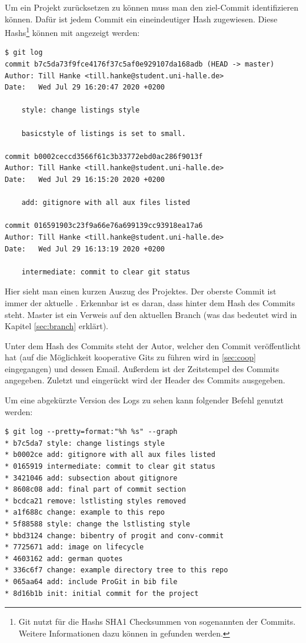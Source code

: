 Um ein Projekt zurücksetzen zu können muss man den ziel-Commit identifizieren können. Dafür ist jedem Commit ein eineindeutiger Hash zugewiesen. Diese Hashs\footnote{Git nutzt für die Hashs SHA1 Checksummen von sogenannten  der Commits. Weitere Informationen dazu können in \cite{ProGit} gefunden werden.} können mit  angezeigt werden:
\begin{lstlisting}
$ git log
commit b7c5da73f9fce4176f37c5af0e929107da168adb (HEAD -> master)
Author: Till Hanke <till.hanke@student.uni-halle.de>
Date:   Wed Jul 29 16:20:47 2020 +0200

    style: change listings style
    
    basicstyle of listings is set to small.

commit b0002ceccd3566f61c3b33772ebd0ac286f9013f
Author: Till Hanke <till.hanke@student.uni-halle.de>
Date:   Wed Jul 29 16:15:20 2020 +0200

    add: gitignore with all aux files listed

commit 016591903c23f9a66e76a699139cc93918ea17a6
Author: Till Hanke <till.hanke@student.uni-halle.de>
Date:   Wed Jul 29 16:13:19 2020 +0200

    intermediate: commit to clear git status
\end{lstlisting}
Hier sieht man einen kurzen Auszug des Projektes. Der oberste Commit ist immer der aktuelle . Erkennbar ist es daran, dass hinter dem Hash des Commits  steht. Master ist ein Verweis auf den aktuellen Branch (was das bedeutet wird in Kapitel \ref{sec:branch} erklärt).

Unter dem Hash des Commits steht der Autor, welcher den Commit veröffentlicht hat (auf die Möglichkeit kooperative Gits zu führen wird in \ref{sec:coop} eingegangen) und dessen Email.
Außerdem ist der Zeitstempel des Commits angegeben. Zuletzt und eingerückt wird der Header des Commits ausgegeben.

Um eine abgekürzte Version des Logs zu sehen kann folgender Befehl genutzt werden:
\begin{lstlisting}
$ git log --pretty=format:"%h %s" --graph
* b7c5da7 style: change listings style
* b0002ce add: gitignore with all aux files listed
* 0165919 intermediate: commit to clear git status
* 3421046 add: subsection about gitignore
* 8608c08 add: final part of commit section
* bcdca21 remove: lstlisting styles removed
* a1f688c change: example to this repo
* 5f88588 style: change the lstlisting style
* bbd3124 change: bibentry of progit and conv-commit
* 7725671 add: image on lifecycle
* 4603162 add: german quotes
* 336c6f7 change: example directory tree to this repo
* 065aa64 add: include ProGit in bib file
* 8d16b1b init: initial commit for the project
\end{lstlisting}

